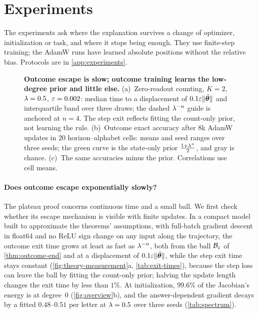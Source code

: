 \section{Experiments}
\label{sec:experiments}
\label{sec:validation}

The experiments ask where the explanation survives a change of optimizer, initialization or task, and where it stops being enough.
They use finite-step training; the AdamW runs have learned absolute positions without the relative bias. Protocols are in \cref{app:experiments}.

\begin{figure}[t]
\centering
\resizebox{\linewidth}{!}{}
\caption{\textbf{Outcome escape is slow; outcome training learns the low-degree prior and little else.}
(a)~Zero-readout counting, $K=2$, $\lambda=0.5$, $\varepsilon=0.002$: median time to a displacement of $0.1\varepsilon\|\tilde{\bm\theta}\|$ and interquartile band over three draws; the dashed $\lambda^{-n}$ guide is anchored at $n=4$. The step exit reflects fitting the count-only prior, not learning the rule.
(b)~Outcome exact accuracy after $8$k AdamW updates in $20$ horizon--alphabet cells: means and seed ranges over three seeds; the green curve is the state-only prior $\frac{1+\lambda^n}{2}$, and gray is chance.
(c)~The same accuracies minus the prior. Correlations use cell means.}
\label{fig:theory-measurement}
\label{fig:lambda-grid}
\end{figure}

\paragraph{Does outcome escape exponentially slowly?} The plateau proof concerns continuous time and a small ball. We first check
whether its escape mechanism is visible with finite updates. In a compact model built to approximate the theorems' assumptions, with full-batch gradient descent
in float64 and no ReLU sign change on any input along the trajectory, the outcome exit time grows at least as fast as $\lambda^{-n}$, both from the
ball $\mathcal B_{\varepsilon}$ of \cref{thm:outcome-end} and at a displacement of $0.1\varepsilon\|\tilde{\bm\theta}\|$, while the step exit time stays
constant (\cref{fig:theory-measurement}a, \cref{tab:exit-times}), because the step loss can leave the ball by fitting the count-only prior;
halving the update length changes the exit time by less than $1\%$. At
initialization, $99.6\%$ of the Jacobian's energy is at degree~$0$ (\cref{fig:overview}b), and the answer-dependent
gradient decays by a fitted $0.48$--$0.51$ per letter at $\lambda=0.5$ over three seeds (\cref{tab:spectrum}).

